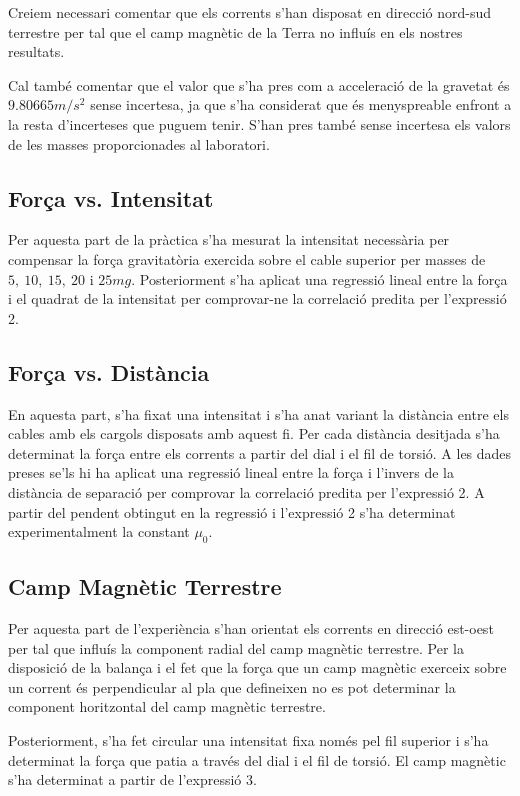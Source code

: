 Creiem necessari comentar que els corrents s'han disposat en direcció nord-sud terrestre per tal que el camp magnètic de la Terra no influís en els nostres resultats.

Cal també comentar que el valor que s'ha pres com a acceleració de la gravetat és $9.80665 \si{m/s^2}$ sense incertesa, ja que s'ha considerat que és menyspreable enfront a la resta d'incerteses que puguem tenir. S'han pres també sense incertesa els valors de les masses proporcionades al laboratori.

\subsection{Força vs. Intensitat}

Per aquesta part de la pràctica s'ha mesurat la intensitat necessària per compensar la força gravitatòria exercida sobre el cable superior per masses de $5,\ 10,\ 15,\ 20$ i $25\si{mg}$. Posteriorment s'ha aplicat una regressió lineal entre la força i el quadrat de la intensitat per comprovar-ne la correlació predita per l'expressió 2.

\subsection{Força vs. Distància}
En aquesta part, s'ha fixat una intensitat i s'ha anat variant la distància entre els cables amb els cargols disposats amb aquest fi. Per cada distància desitjada s'ha determinat la força entre els corrents a partir del dial i el fil de torsió. A les dades preses se'ls hi ha aplicat una regressió lineal entre la força i l'invers de la distància de separació per comprovar la correlació predita per l'expressió 2. A partir del pendent obtingut en la regressió i l'expressió 2 s'ha determinat experimentalment la constant $\mu_0$.
\subsection{Camp Magnètic Terrestre}
Per aquesta part de l'experiència %
s'han orientat els corrents en direcció est-oest per tal que influís la component radial del camp magnètic terrestre. Per la disposició de la balança i el fet que la força que un camp magnètic exerceix sobre un corrent és perpendicular al pla que defineixen no es pot determinar la component horitzontal del camp magnètic terrestre.

Posteriorment, s'ha fet circular una intensitat fixa només pel fil superior i s'ha determinat la força que patia a través del dial i el fil de torsió. El camp magnètic s'ha determinat a partir de l'expressió 3.

